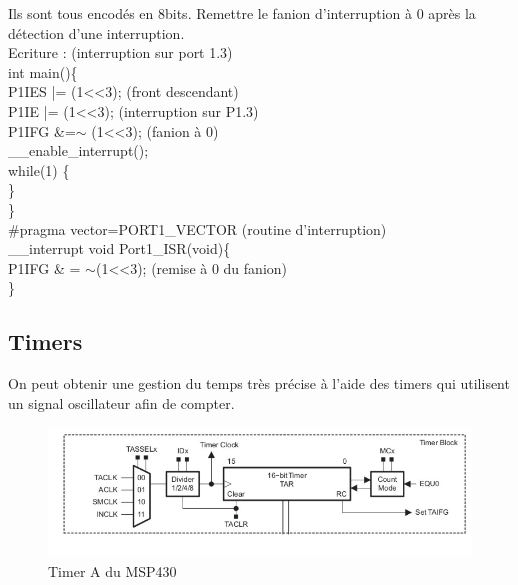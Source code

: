 \documentclass[../main.tex]{subfiles}
\begin{document}
Ils sont tous encodés en 8bits. \warning Remettre le fanion d'interruption à 0 après la détection d'une interruption.\\

Ecriture : (interruption sur port 1.3) \\
int main()\{\\
\qquad P1IES |= (1<<3); (front descendant)\\
\qquad P1IE |= (1<<3); (interruption sur P1.3)\\
\qquad P1IFG \&=$\sim$ (1<<3); (fanion à 0)\\
\qquad \_\_enable\_interrupt();\\
\qquad while(1) \{\\
\}\\
\}\\
\#pragma vector=PORT1\_VECTOR (routine d'interruption)\\
\_\_interrupt void Port1\_ISR(void)\{\\
\qquad P1IFG \& = $\sim$(1<<3); (remise à 0 du fanion)\\
\}\\


\subsection{Timers}
On peut obtenir une gestion du temps très précise à l'aide des timers qui utilisent un signal oscillateur afin de compter.\\

\begin{figure}[hbt!]
    \centering
    \includegraphics[width=.7\textwidth]{IMAGES/proddev/Screenshot from 2024-04-25 10-49-21.png}
    \caption{Timer A du MSP430}
\end{figure}
\end{document}
